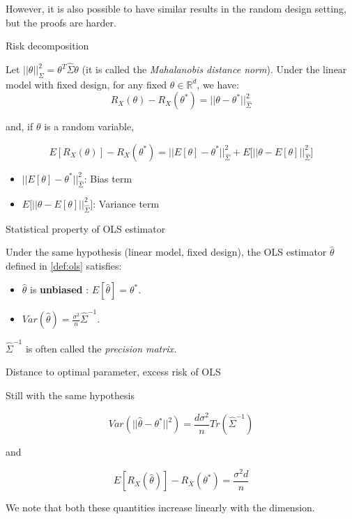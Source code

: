 \documentclass[
10pt, %
a4paper, %
oneside, %
headinclude,footinclude, %
BCOR5mm, %
]{scrartcl}
\begin{document}
However, it is also possible to have similar results in the random design setting, but the proofs are harder.

\begin{proposition}{Risk decomposition}

    Let $||\theta||_{\Sigma}^2 = \theta^T\hat{\Sigma} \theta$ (it is called the \textit{{Mahalanobis distance norm}}).  Under the linear model with fixed design, for any fixed $\theta \in \mathbb{R}^d$, we have:
    \begin{equation}
	R_X(\theta)-R_X( \theta^*) = ||\theta-\theta^*||_{\hat{\Sigma}}^2
    \end{equation}

    and, if $\theta$ is a random variable,

    \begin{equation}
	E[R_X(\theta)]-R_X(\theta^*) = ||E[\theta]-\theta^*||_{\hat{\Sigma}}^2+E\Big[||\theta-E[\theta]||_{\hat{\Sigma}}^2\Big]
    \end{equation}
    \begin{itemize}
	\item $||E[\theta]-\theta^*||_{\hat{\Sigma}}^2$: Bias term
	\item $E\Big[||\theta-E[\theta]||_{\hat{\Sigma}}^2\Big]$: Variance term
    \end{itemize}
\end{proposition}

\begin{proposition}{Statistical property of OLS estimator}

    Under the same hypothesis (linear model, fixed design), the OLS estimator $ \hat{\theta}$ defined in \ref{def:ols} satisfies:

    \begin{itemize}
	\item $ \hat{\theta}$ is \textbf{{unbiased}} : $ E[ \hat{\theta}] = \theta^*$.
	\item $ Var( \hat{\theta}) = \frac{\sigma^2}{n} \hat{\Sigma}^{-1}$.
    \end{itemize}
\end{proposition}
    

$ \hat{\Sigma}^{-1}$ is often called the \textit{{precision matrix.}} 

\begin{corollary}{Distance to optimal parameter, excess risk of OLS}

    Still with the same hypothesis

    \begin{equation}
	Var(|| \hat{\theta}-\theta^*||^2) = \frac{d\sigma^2}{n} Tr(\hat{\Sigma}^{-1})
    \end{equation}

    and

    \begin{equation}
	E[R_X( \hat{\theta})]-R_X( \theta^*) = \frac{\sigma ^2d}{n} 
    \end{equation}

    We note that both these quantities increase linearly with the dimension.
\end{corollary}
\end{document}
